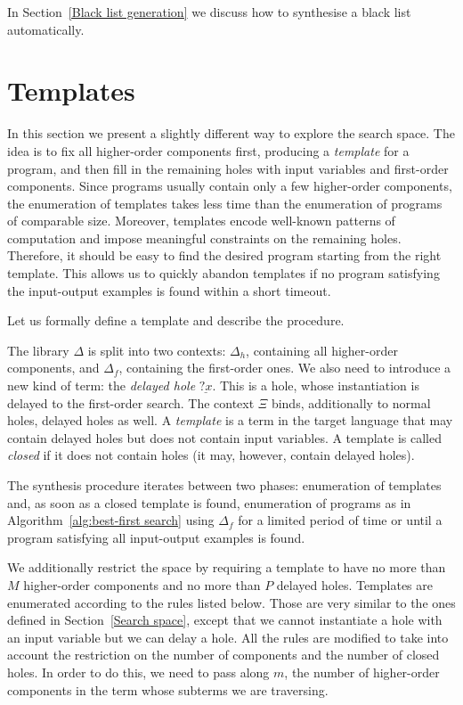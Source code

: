 In Section~\ref{Black list generation} we discuss how to synthesise a black list automatically.

\section{Templates}\label{Templates}
In this section we present a slightly different way to explore the search space. The idea is to fix all higher-order components first, producing a \emph{template} for a program, and then fill in the remaining holes with input variables and first-order components. Since programs usually contain only a few higher-order components, the enumeration of templates takes less time than the enumeration of programs of comparable size. Moreover, templates encode well-known patterns of computation and impose meaningful constraints on the remaining holes. Therefore, it should be easy to find the desired program starting from the right template. This allows us to quickly abandon templates if no program satisfying the input-output examples is found within a short timeout.

Let us formally define a template and describe the procedure.

The library $\Delta$ is split into two contexts: $\Delta_h$, containing all higher-order components, and $\Delta_f$, containing the first-order ones. We also need to introduce a new kind of term: the \emph{delayed hole} $\underline{?x}$. This is a hole, whose instantiation is delayed to the first-order search. The context $\Xi$ binds, additionally to normal holes, delayed holes as well.
A \emph{template} is a term in the target language that may contain delayed holes but does not contain input variables. A template is called \emph{closed} if it does not contain holes (it may, however, contain delayed holes).

The synthesis procedure iterates between two phases: enumeration of templates and, as soon as a closed template is found, enumeration of programs as in Algorithm~\ref{alg:best-first search} using $\Delta_f$ for a limited period of time or until a program satisfying all input-output examples is found.

We additionally restrict the space by requiring a template to have no more than $M$ higher-order components and no more than $P$ delayed holes. Templates are enumerated according to the rules listed below. Those are very similar to the ones defined in Section~\ref{Search space}, except that we cannot instantiate a hole with an input variable but we can delay a hole. All the rules are modified to take into account the restriction on the number of components and the number of closed holes. In order to do this, we need to pass along $m$, the number of higher-order components in the term whose subterms we are traversing.

